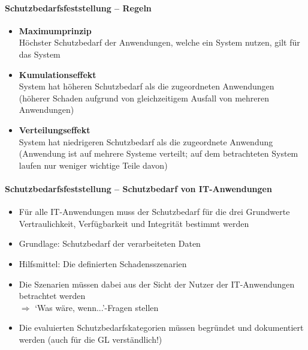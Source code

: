 \documentclass[10pt,a4paper]{article}
\begin{document}
\paragraph*{Schutzbedarfsfeststellung – Regeln}
\begin{itemize}[noitemsep,topsep=0pt,leftmargin=*]
    \item \textbf{Maximumprinzip}\\Höchster Schutzbedarf der Anwendungen, welche ein System nutzen, gilt für das System
    \item \textbf{Kumulationseffekt}\\System hat höheren Schutzbedarf als die zugeordneten Anwendungen (höherer Schaden aufgrund von gleichzeitigem Ausfall von mehreren Anwendungen)
    \item \textbf{Verteilungseffekt}\\System hat niedrigeren Schutzbedarf als die zugeordnete Anwendung (Anwendung ist auf mehrere Systeme verteilt; auf dem betrachteten System laufen nur weniger wichtige Teile davon)
\end{itemize}

\paragraph*{Schutzbedarfsfeststellung – Schutzbedarf von IT-Anwendungen}
\begin{itemize}[noitemsep,topsep=0pt,leftmargin=*]
    \item Für alle IT-Anwendungen muss der Schutzbedarf für die drei Grundwerte Vertraulichkeit, Verfügbarkeit und Integrität bestimmt werden
    \item Grundlage: Schutzbedarf der verarbeiteten Daten
    \item Hilfsmittel: Die definierten Schadensszenarien
    \item Die Szenarien müssen dabei aus der Sicht der Nutzer der IT-Anwendungen betrachtet werden\\ $\Rightarrow$ `Was wäre, wenn...'-Fragen stellen
    \item Die evaluierten Schutzbedarfskategorien müssen begründet und dokumentiert werden (auch für die GL verständlich!)
\end{itemize}
\end{document}
